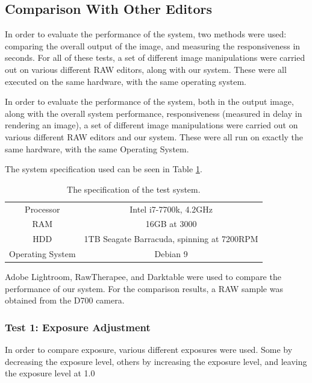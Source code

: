 \documentclass[10pt,a4paper]{article}
\begin{document}
\subsection{Comparison With Other Editors}
In order to evaluate the performance of the system, two methods were used: comparing the overall output of the image,
and measuring the responsiveness in seconds. For all of these tests, a set of different image manipulations were carried out
on various different RAW editors, along with our system. These were all executed on the same hardware, with the same operating system.

In order to evaluate the performance of the system, both in the output image, along with the overall system performance,
responsiveness (measured in delay in rendering an image), a set of different image manipulations were carried out on various
different RAW editors and our system. These were all run on exactly the same hardware, with the same Operating System.

The system specification used can be seen in Table \ref{SystemSpecs}.

\begin{table}
    \centering
    \begin{tabular}{| c | c |}
        \hline
        Processor & Intel i7-7700k, 4.2GHz\\
        RAM & 16GB at 3000\\
        HDD & 1TB Seagate Barracuda, spinning at 7200RPM\\
        Operating System & Debian 9\\
        \hline
    \end{tabular}
    \caption{The specification of the test system.}
    \label{SystemSpecs}
\end{table}

Adobe Lightroom, RawTherapee, and Darktable were used to compare the performance of our system. For the comparison results,
a RAW sample was obtained from the D700 camera.

\subsubsection{Test 1: Exposure Adjustment}
In order to compare exposure, various different exposures were used. Some by decreasing the exposure level, others by
increasing the exposure level, and leaving the exposure level at 1.0

\end{document}
